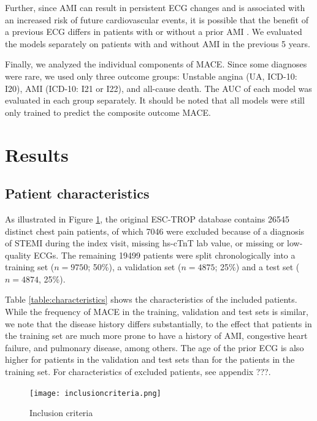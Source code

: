 \documentclass[preprint]{elsarticle}
\begin{document}
Further, since AMI can result in persistent ECG changes and is associated with an increased risk of future cardiovascular events, it is possible that the benefit of a previous ECG differs in patients with or without a prior AMI \citep{strom2007,sawai2017}. We evaluated the models separately on patients with and without AMI in the previous 5 years.

Finally, we analyzed the individual components of MACE. Since some diagnoses were rare, we used only three outcome groups: Unstable angina (UA, ICD-10: I20), AMI (ICD-10: I21 or I22), and all-cause death. The AUC of each model was evaluated in each group separately. It should be noted that all models were still only trained to predict the composite outcome MACE.

\section{Results}
\subsection{Patient characteristics}
As illustrated in Figure \ref{fig:inclusion}, the original ESC-TROP database contains 26545 distinct chest pain patients, of which 7046 were excluded because of a diagnosis of STEMI during the index visit, missing hs-cTnT lab value, or missing or low-quality ECGs. The remaining 19499 patients were split chronologically into a training set ($n=9750$; 50\%), a validation set ($n=4875$; 25\%) and a test set ($n=4874$, 25\%).

Table \ref{table:characteristics} shows the characteristics of the included patients. While the frequency of MACE in the training, validation and test sets is similar, we note that the disease history differs substantially, to the effect that patients in the training set are much more prone to have a history of AMI, congestive heart failure, and pulmonary disease, among others. The age of the prior ECG is also higher for patients in the validation and test sets than for the patients in the training set. For characteristics of excluded patients, see appendix ???. 

\begin{figure}[h!]
    \texttt{[image: inclusioncriteria.png]}
    \centering
    \caption{Inclusion criteria}
    \label{fig:inclusion}
\end{figure}
\end{document}
